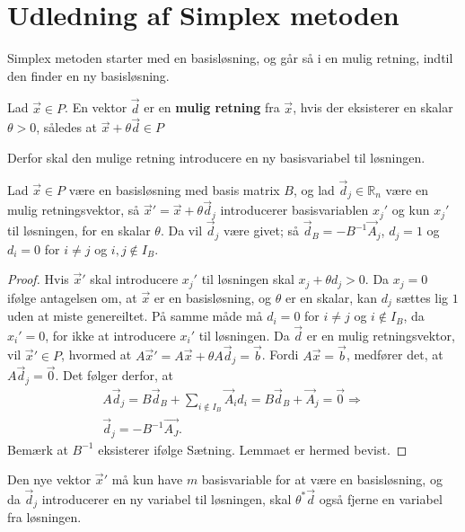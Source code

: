 \section{Udledning af Simplex metoden}
Simplex metoden starter med en basisløsning, og går så i en mulig retning, indtil den finder en ny basisløsning.

\begin{defn}
Lad $\vec{x} \in P$. En vektor $\vec{d}$ er en \textbf{mulig retning} fra $\vec{x}$, hvis der eksisterer en skalar $\theta > 0$, således at $\vec{x}+\theta\vec{d} \in P$ 
\end{defn}

Derfor skal den mulige retning introducere en ny basisvariabel til løsningen.

\begin{lma}
Lad $\vec{x} \in P$ være en basisløsning med basis matrix $B$, og lad $\vec{d}_j  \in \mathds{R}_n$ være en mulig retningsvektor, så $\vec{x}' = \vec{x}+ \theta\vec{d}_j$ introducerer basisvariablen $x_j'$ og kun $x_j'$ til løsningen, for en skalar $\theta$.
Da vil $\vec{d}_j$ være givet; så $\vec{d}_B = -B^{-1}\vec{A}_j$, $d_j = 1$ og $d_i = 0$ for $i \neq j$ og $ i,j \notin I_B$.
\label{lma:retningsvektor}
\end{lma}

\begin{proof}
Hvis $\vec{x}'$ skal introducere $x_j'$ til løsningen skal $x_j + \theta d_j > 0$. 
Da $x_j = 0$ ifølge antagelsen om, at $\vec{x}$ er en basisløsning, og $\theta$ er en skalar, kan $d_j$ sættes lig $1$ uden at miste genereiltet. 
På samme måde må $d_i = 0$ for $i \neq j$ og $i \notin I_B$, da $x_i' = 0$, for ikke at introducere $x_i'$ til løsningen.
Da $\vec{d}$ er en mulig retningsvektor, vil $\vec{x}' \in P$, hvormed at $A\vec{x}' = A\vec{x}+ \theta A\vec{d}_j = \vec{b}$. 
Fordi $A\vec{x} = \vec{b}$, medfører det, at $A\vec{d}_j = \vec{0}$.
Det følger derfor, at
\begin{align*}
A\vec{d}_j = B \vec{d}_B + \sum_{i \notin I_B} \vec{A}_id_i = B\vec{d}_B + \vec{A}_j = \vec{0} \Rightarrow
\\ \vec{d}_j = -B^{-1}\vec{A_J}.
\end{align*}
Bemærk at $B^{-1}$ eksisterer ifølge Sætning. 
Lemmaet er hermed bevist.
\end{proof}

Den nye vektor $\vec{x}'$ må kun have $m$ basisvariable for at være en basisløsning, og da $\vec{d}_j$ introducerer en ny variabel til løsningen, skal $\theta^*\vec{d}$ også fjerne en variabel fra  løsningen.

